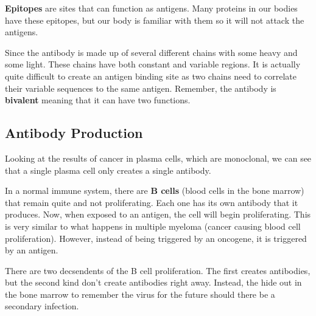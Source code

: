 \documentclass{article}
\begin{document}
\textbf{Epitopes} are sites that can function as antigens. Many
proteins in our bodies have these epitopes, but our body is familiar with them
so it will not attack the antigens. 

Since the antibody is made up of several different chains with some heavy and
some light. These chains have both constant and variable regions. It is actually
quite difficult to create an antigen binding site as two chains need to
correlate their variable sequences to the same antigen. Remember, the antibody
is \textbf{bivalent} meaning that it can have two functions. 

\subsection{ Antibody Production }

Looking at the results of cancer in plasma cells, which are monoclonal, we can
see that a single plasma cell only creates a single antibody.

In a normal immune system, there are \textbf{B cells} (blood cells in the bone
marrow) that remain quite and not proliferating. Each one has its own antibody
that it produces. Now, when exposed to an antigen, the cell will begin
proliferating. This is very similar to what happens in multiple myeloma (cancer
causing blood cell proliferation). However, instead of being triggered by an
oncogene, it is triggered by an antigen. 

There are two decsendents of the B cell proliferation. The first creates
antibodies, but the second kind don't create antibodies right away. Instead, the
hide out in the bone marrow to remember the virus for the future should there be
a secondary infection.
\end{document}
